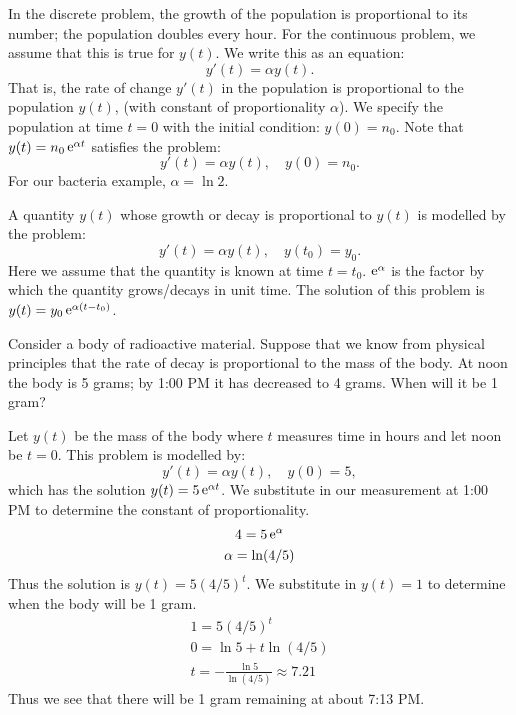 \begin{Example}
  In the discrete problem, the growth of the population is proportional 
  to its number; the population doubles every hour.  For the continuous
  problem, we assume that this is true for $y(t)$.  We write this as an 
  equation:
  \[
  y'(t) = \alpha y(t).
  \]
  That is, the rate of change $y'(t)$ in the population is proportional
  to the population $y(t)$, (with constant of proportionality $\alpha$).
  We specify the population at time $t = 0$ with the initial condition:
  $y(0) = n_0$.  Note that $y(t) = n_0 \mathop{\mathrm{e}}\nolimits^{\alpha t}$ satisfies the problem:
  \[
  y'(t) = \alpha y(t), \quad y(0) = n_0.
  \]
  For our bacteria example, $\alpha = \ln 2$.
\end{Example}


\begin{Result}
  A quantity $y(t)$ whose growth or decay is proportional to $y(t)$
  is modelled by the problem:
  \[
  y'(t) = \alpha y(t), \quad y(t_0) = y_0.
  \]
  Here we assume that the quantity is known at time $t = t_0$.
  $\mathop{\mathrm{e}}\nolimits^\alpha$ is the factor by which the quantity grows/decays in unit time.
  The solution of this problem is
  $y(t) = y_0 \mathop{\mathrm{e}}\nolimits^{\alpha (t - t_0)}$.
\end{Result}



\begin{Example}
  Consider a body of radioactive material.  Suppose that we 
  know from physical principles that the rate of decay is proportional to the 
  mass of the body.  At noon the body is 5 grams; by 1:00 PM  it has
  decreased to 4 grams.  When will it be 1 gram?

  Let $y(t)$ be the mass of the body where $t$ measures time in hours and 
  let noon be $t = 0$.  This problem is modelled by:
  \[
  y'(t) = \alpha y(t), \quad y(0) = 5,
  \]
  which has the solution $y(t) = 5 \mathop{\mathrm{e}}\nolimits^{\alpha t}$.  We substitute in our measurement
  at 1:00 PM to determine the constant of proportionality.
  \begin{gather*}
    4 = 5 \mathop{\mathrm{e}}\nolimits^{\alpha}
    \\
    \alpha = \ln(4 / 5)
  \end{gather*}
  Thus the solution is $y(t) = 5 (4/5)^t$.  We substitute in $y(t) = 1$ to 
  determine when the body will be 1 gram.
  \begin{gather*}
    1 = 5 (4/5)^t
    \\
    0 = \ln 5 + t \ln(4/5)
    \\
    t = - \frac{ \ln 5 }{ \ln(4/5) } \approx 7.21
  \end{gather*}
  Thus we see that there will be 1 gram remaining at about 7:13 PM.
\end{Example}





